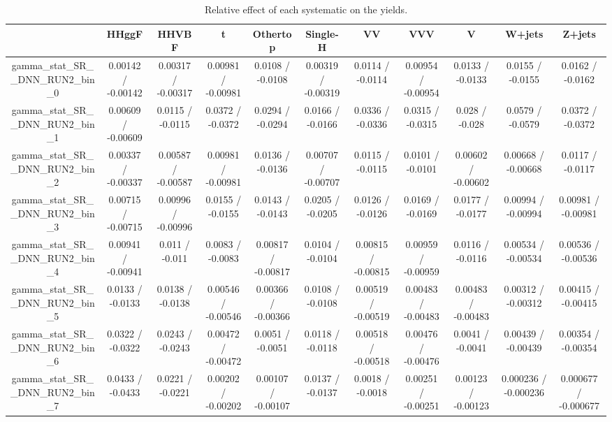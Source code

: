 \documentclass[10pt]{article}
\begin{document}
\begin{table}[htbp]
\begin{center}
\begin{tabular}{|c|c|c|c|c|c|c|c|c|c|c|}
\hline 
      & HHggF      & HHVBF      & t      & Othertop      & Single-H      & VV      & VVV      & V      & W+jets      & Z+jets \\ 
\hline 
  gamma_stat_SR__DNN_RUN2_bin_0 & 0.00142 / -0.00142 & 0.00317 / -0.00317 & 0.00981 / -0.00981 & 0.0108 / -0.0108 & 0.00319 / -0.00319 & 0.0114 / -0.0114 & 0.00954 / -0.00954 & 0.0133 / -0.0133 & 0.0155 / -0.0155 & 0.0162 / -0.0162 \\ 
  gamma_stat_SR__DNN_RUN2_bin_1 & 0.00609 / -0.00609 & 0.0115 / -0.0115 & 0.0372 / -0.0372 & 0.0294 / -0.0294 & 0.0166 / -0.0166 & 0.0336 / -0.0336 & 0.0315 / -0.0315 & 0.028 / -0.028 & 0.0579 / -0.0579 & 0.0372 / -0.0372 \\ 
  gamma_stat_SR__DNN_RUN2_bin_2 & 0.00337 / -0.00337 & 0.00587 / -0.00587 & 0.00981 / -0.00981 & 0.0136 / -0.0136 & 0.00707 / -0.00707 & 0.0115 / -0.0115 & 0.0101 / -0.0101 & 0.00602 / -0.00602 & 0.00668 / -0.00668 & 0.0117 / -0.0117 \\ 
  gamma_stat_SR__DNN_RUN2_bin_3 & 0.00715 / -0.00715 & 0.00996 / -0.00996 & 0.0155 / -0.0155 & 0.0143 / -0.0143 & 0.0205 / -0.0205 & 0.0126 / -0.0126 & 0.0169 / -0.0169 & 0.0177 / -0.0177 & 0.00994 / -0.00994 & 0.00981 / -0.00981 \\ 
  gamma_stat_SR__DNN_RUN2_bin_4 & 0.00941 / -0.00941 & 0.011 / -0.011 & 0.0083 / -0.0083 & 0.00817 / -0.00817 & 0.0104 / -0.0104 & 0.00815 / -0.00815 & 0.00959 / -0.00959 & 0.0116 / -0.0116 & 0.00534 / -0.00534 & 0.00536 / -0.00536 \\ 
  gamma_stat_SR__DNN_RUN2_bin_5 & 0.0133 / -0.0133 & 0.0138 / -0.0138 & 0.00546 / -0.00546 & 0.00366 / -0.00366 & 0.0108 / -0.0108 & 0.00519 / -0.00519 & 0.00483 / -0.00483 & 0.00483 / -0.00483 & 0.00312 / -0.00312 & 0.00415 / -0.00415 \\ 
  gamma_stat_SR__DNN_RUN2_bin_6 & 0.0322 / -0.0322 & 0.0243 / -0.0243 & 0.00472 / -0.00472 & 0.0051 / -0.0051 & 0.0118 / -0.0118 & 0.00518 / -0.00518 & 0.00476 / -0.00476 & 0.0041 / -0.0041 & 0.00439 / -0.00439 & 0.00354 / -0.00354 \\ 
  gamma_stat_SR__DNN_RUN2_bin_7 & 0.0433 / -0.0433 & 0.0221 / -0.0221 & 0.00202 / -0.00202 & 0.00107 / -0.00107 & 0.0137 / -0.0137 & 0.0018 / -0.0018 & 0.00251 / -0.00251 & 0.00123 / -0.00123 & 0.000236 / -0.000236 & 0.000677 / -0.000677 \\ 
\hline 
\end{tabular} 
\caption{Relative effect of each systematic on the yields.} 
\end{center} 
\end{table} 
\end{document}
